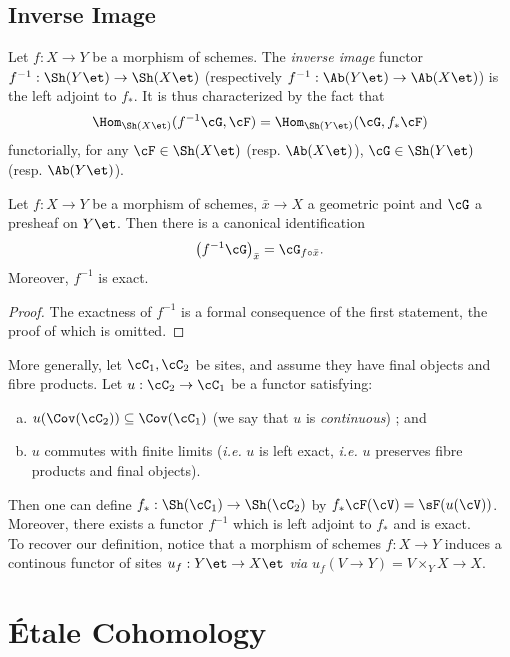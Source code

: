 \subsection{Inverse Image}

\begin{defi}
Let $f: X\to Y$ be a morphism of schemes. The \emph{inverse image} functor  $f^{-1} : \Sh(Y\et)\to \Sh(X\et)$ (respectively $f^{-1}: \Ab(Y\et) \to \Ab(X\et)$) is the left adjoint to $f_*$. It is thus characterized by the fact that 
$$
\Hom_{{\Sh(X\et)}} (f^{-1}\cG, \cF) = \Hom_{\Sh(Y\et)} (\cG, f_*\cF) 
$$
functorially, for any $\cF \in \Sh(X\et)$ (resp. $\Ab(X\et)$), $\cG \in \Sh(Y\et)$ (resp. $\Ab(Y\et)$).
\end{defi}

\begin{lem} 
Let $f : X \to Y$ be a morphism of schemes, $\bar x \to X$ a geometric point and $\cG$ a presheaf on $Y\et$. Then there is a canonical identification 
$$
\left(f^{-1}\cG\right)_{\bar x} = \cG_{f\circ \bar x}.
$$
Moreover, $f^{-1}$ is exact.
\end{lem}

\begin{proof}
The exactness of $f^{-1}$ is a formal consequence of the first statement, the proof of which is omitted.
\end{proof}
	
\begin{remark}
More generally, let $\cC_1, \cC_2$ be sites, and assume they have final objects and fibre products.  Let  $u: \cC_2 \to \cC_1$ be a functor satisfying:
\begin{enumerate}[(a)]
\item $u (\Cov(\cC_2)) \subseteq \Cov(\cC_1)$ (we say that $u$ is \emph{continuous}) ; and
\item $u$ commutes with finite limits ({\it i.e.} $u$ is left exact, {\it i.e.} $u$ preserves fibre products and final objects).
\end{enumerate}
Then one can define $f_*: \Sh(\cC_1) \to \Sh(\cC_2)$ by $ f_* \cF(\cV) = \sF(u(\cV))$. Moreover, there exists a functor $f^{-1}$ which is left adjoint to $f_*$ and is exact.
\\
To recover our definition, notice that a morphism of schemes $ f: X  \to Y$ induces a continous functor of sites $u_f: Y\et \to X\et$ {\it via} $u_f (V \to Y) = V \times_Y X \to X$.
\end{remark} %
\section{\'Etale Cohomology}

